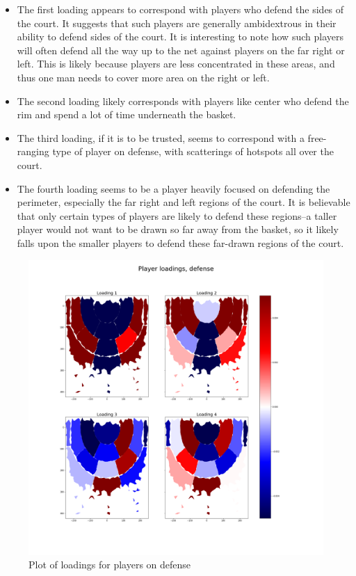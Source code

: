 \documentclass[]{article}
\begin{document}
\begin{itemize}
\item
  The first loading appears to correspond with players who defend the
  sides of the court. It suggests that such players are generally
  ambidextrous in their ability to defend sides of the court. It is
  interesting to note how such players will often defend all the way up
  to the net against players on the far right or left. This is likely
  because players are less concentrated in these areas, and thus one man
  needs to cover more area on the right or left.
\item
  The second loading likely corresponds with players like center who
  defend the rim and spend a lot of time underneath the basket.
\item
  The third loading, if it is to be trusted, seems to correspond with a
  free-ranging type of player on defense, with scatterings of hotspots
  all over the court.
\item
  The fourth loading seems to be a player heavily focused on defending
  the perimeter, especially the far right and left regions of the court.
  It is believable that only certain types of players are likely to
  defend these regions--a taller player would not want to be drawn so
  far away from the basket, so it likely falls upon the smaller players
  to defend these far-drawn regions of the court.
\end{itemize}

\begin{figure}
\centering
\includegraphics{first_4_loadings_players_def.png}
\caption{Plot of loadings for players on defense}
\end{figure}
\end{document}
